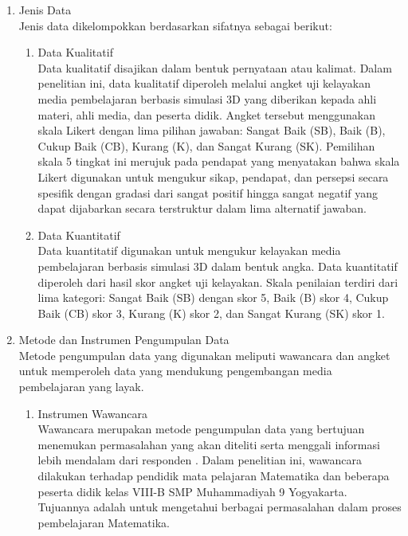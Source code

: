 \begin{enumerate}
    \item Jenis Data\\
    \hspace*{1cm}Jenis data dikelompokkan berdasarkan sifatnya sebagai berikut:
    \begin{enumerate}
        \item Data Kualitatif\\
        \hspace*{1cm}Data kualitatif disajikan dalam bentuk pernyataan atau kalimat. Dalam penelitian ini, data kualitatif diperoleh melalui angket uji kelayakan media pembelajaran berbasis simulasi 3D yang diberikan kepada ahli materi, ahli media, dan peserta didik. Angket tersebut menggunakan skala Likert dengan lima pilihan jawaban: Sangat Baik (SB), Baik (B), Cukup Baik (CB), Kurang (K), dan Sangat Kurang (SK). Pemilihan skala 5 tingkat ini merujuk pada pendapat \citet{sugiyono2018} yang menyatakan bahwa skala Likert digunakan untuk mengukur sikap, pendapat, dan persepsi secara spesifik dengan gradasi dari sangat positif hingga sangat negatif yang dapat dijabarkan secara terstruktur dalam lima alternatif jawaban.
        \item Data Kuantitatif\\
        \hspace*{1cm}Data kuantitatif digunakan untuk mengukur kelayakan media pembelajaran berbasis simulasi 3D dalam bentuk angka. Data kuantitatif diperoleh dari hasil skor angket uji kelayakan. Skala penilaian terdiri dari lima kategori: Sangat Baik (SB) dengan skor 5, Baik (B) skor 4, Cukup Baik (CB) skor 3, Kurang (K) skor 2, dan Sangat Kurang (SK) skor 1.
    \end{enumerate}
    \item Metode dan Instrumen Pengumpulan Data\\
    \hspace*{1cm}Metode pengumpulan data yang digunakan meliputi wawancara dan angket untuk memperoleh data yang mendukung pengembangan media pembelajaran yang layak.
    \begin{enumerate}
        \item Instrumen Wawancara\\
        \hspace*{1cm}Wawancara merupakan metode pengumpulan data yang bertujuan menemukan permasalahan yang akan diteliti serta menggali informasi lebih mendalam dari responden \citep{sugiyono2018}. Dalam penelitian ini, wawancara dilakukan terhadap pendidik mata pelajaran Matematika dan beberapa peserta didik kelas VIII-B SMP Muhammadiyah 9 Yogyakarta. Tujuannya adalah untuk mengetahui berbagai permasalahan dalam proses pembelajaran Matematika.

\end{enumerate}
\end{enumerate}
